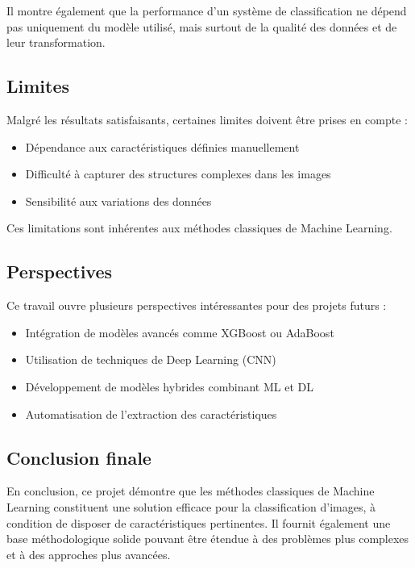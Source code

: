 \documentclass[12pt,a4paper]{article}
\begin{document}
    Il montre également que la performance d’un système de classification ne dépend pas uniquement du modèle utilisé, mais surtout de la qualité des données et de leur transformation.

    \subsection{Limites}

    Malgré les résultats satisfaisants, certaines limites doivent être prises en compte :
    \begin{itemize}
        \item Dépendance aux caractéristiques définies manuellement
        \item Difficulté à capturer des structures complexes dans les images
        \item Sensibilité aux variations des données
    \end{itemize}

    Ces limitations sont inhérentes aux méthodes classiques de Machine Learning.

    \subsection{Perspectives}

    Ce travail ouvre plusieurs perspectives intéressantes pour des projets futurs :
    \begin{itemize}
        \item Intégration de modèles avancés comme XGBoost ou AdaBoost
        \item Utilisation de techniques de Deep Learning (CNN)
        \item Développement de modèles hybrides combinant ML et DL
        \item Automatisation de l’extraction des caractéristiques
    \end{itemize}

    \subsection{Conclusion finale}

    En conclusion, ce projet démontre que les méthodes classiques de Machine Learning constituent une solution efficace pour la classification d’images, à condition de disposer de caractéristiques pertinentes.
    Il fournit également une base méthodologique solide pouvant être étendue à des problèmes plus complexes et à des approches plus avancées.
\end{document}
